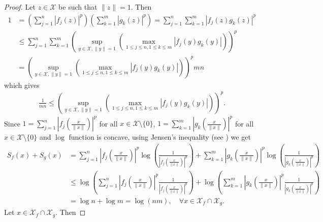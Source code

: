 \documentclass{amsart}
\begin{document}
\begin{proof}
	Let $z \in \mathcal{X}$ be such that $\|z\|=1$. Then 
	\begin{align*}
		1&=\left(\sum_{j=1}^n|f_j(z)|^p\right)\left(\sum_{k=1}^m|g_k(z)|^p\right)=\sum_{j=1}^n\sum_{k=1}^m
	|f_j(z)g_k(z)|^p\\
	&\leq \sum_{j=1}^n\sum_{k=1}^m\left(\displaystyle\sup_{y \in \mathcal{X}, \|y\|=1}\left(\max_{1\leq j\leq n, 1\leq k\leq m}|f_j(y)g_k(y)|\right)\right)^p\\
	&=\left(\displaystyle\sup_{y \in \mathcal{X}, \|y\|=1}\left(\max_{1\leq j\leq n, 1\leq k\leq m}|f_j(y)g_k(y)|\right)\right)^pmn
\end{align*}
which gives 
\begin{align*}
	\frac{1}{mn}\leq \left(\displaystyle\sup_{y \in \mathcal{X}, \|y\|=1}\left(\max_{1\leq j\leq n, 1\leq k\leq m}|f_j(y)g_k(y)|\right)\right)^p.
\end{align*}
Since  $1=\sum_{j=1}^n\left|f_j\left(\frac{x}{\|x\|}\right)\right|^p$ for all  $x \in \mathcal{X}\setminus \{0\}$,  $1=\sum_{k=1}^m\left|g_k\left(\frac{x}{\|x\|}\right)\right|^p$ for all  $x \in \mathcal{X}\setminus \{0\}$ and $\log$ function is concave, using Jensen's inequality (see \cite{STEELE}) we get 
\begin{align*}
	S_f (x)+S_g (x)&=\sum_{j=1}^{n}\left|f_j\left(\frac{x}{\|x\|}\right)\right|^p\log \left(\frac{1}{\left|f_j\left(\frac{x}{\|x\|}\right)\right|^p}\right) +	\sum_{k=1}^{m}\left|g_k\left(\frac{x}{\|x\|}\right)\right|^p\log \left(\frac{1}{\left|g_k\left(\frac{x}{\|x\|}\right)\right|^p}\right)\\
	&\leq \log \left(\sum_{j=1}^{n}\left|f_j\left(\frac{x}{\|x\|}\right)\right|^p \frac{1}{\left|f_j\left(\frac{x}{\|x\|}\right)\right|^p}\right)+\log \left(\sum_{k=1}^{m}\left|g_k\left(\frac{x}{\|x\|}\right)\right|^p \frac{1}{\left|g_k\left(\frac{x}{\|x\|}\right)\right|^p}\right)\\
	&=\log n+\log m=\log (nm), \quad \forall x \in \mathcal{X}_f \cap \mathcal{X}_g.
\end{align*}
Let $x \in \mathcal{X}_f \cap \mathcal{X}_g$. Then 


\end{proof}
\end{document}
